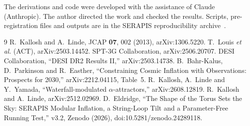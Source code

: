 \documentclass[aps,prd,twocolumn,superscriptaddress,nofootinbib,showkeys]{revtex4-2}
\begin{document}
\begin{acknowledgments}
The derivations and code were developed with the assistance of Claude (Anthropic). The author directed the work and checked the results. Scripts, pre-registration files and outputs are in the SERAPIS reproducibility archive~\cite{SERAPIS}.
\end{acknowledgments}

\begin{thebibliography}{9}
 R.~Kallosh and A.~Linde, JCAP \textbf{07}, 002 (2013), arXiv:1306.5220.
 T.~Louis \emph{et al.} (ACT), arXiv:2503.14452.
 SPT-3G Collaboration, arXiv:2506.20707.
 DESI Collaboration, ``DESI DR2 Results II,'' arXiv:2503.14738.
 B.~Bahr-Kalus, D.~Parkinson and R.~Easther, ``Constraining Cosmic Inflation with Observations: Prospects for 2030,'' arXiv:2212.04115, Table~5.
 R.~Kallosh, A.~Linde and Y.~Yamada, ``Waterfall-modulated $\alpha$-attractors,'' arXiv:2608.12819.
 R.~Kallosh and A.~Linde, arXiv:2512.02969.
 D.~Eldridge, ``The Shape of the Torus Sets the Sky: SERAPIS Modular Inflation, a String-Loop Tilt and a Parameter-Free Running Test,'' v3.2, Zenodo (2026), doi:10.5281/zenodo.24289118.
\end{thebibliography}
\end{document}
